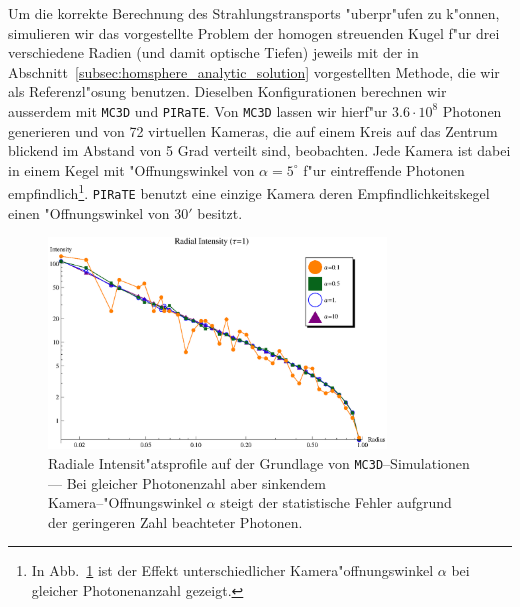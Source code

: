 	Um die korrekte Berechnung des Strahlungstransports "uberpr"ufen zu k"onnen, simulieren wir das vorgestellte Problem der homogen streuenden Kugel f"ur drei verschiedene Radien (und damit optische Tiefen) jeweils mit der in Abschnitt~\ref{subsec:homsphere_analytic_solution} vorgestellten Methode, die wir als Referenzl"osung benutzen. Dieselben Konfigurationen berechnen wir ausserdem mit \texttt{MC3D} und \texttt{PIRaTE}. Von \texttt{MC3D} lassen wir hierf"ur $3.6\cdot10^8$ Photonen generieren und von 72 virtuellen Kameras, die auf einem Kreis auf das Zentrum blickend im Abstand von 5 Grad verteilt sind, beobachten. Jede Kamera ist dabei in einem Kegel mit "Offnungswinkel von $\alpha=5^\circ$ f"ur eintreffende Photonen empfindlich\footnote{In Abb.~\ref{fig:alphacomparison} ist der Effekt unterschiedlicher Kamera"offnungswinkel $\alpha$ bei gleicher Photonenanzahl gezeigt.}. \texttt{PIRaTE} benutzt eine einzige Kamera deren Empfindlichkeitskegel einen "Offnungswinkel von $30'$ besitzt.
	
		\begin{figure}
			\centering
			\includegraphics[width=0.8\textwidth]{mc3dalphasplot.eps}
			\caption{Radiale Intensit"atsprofile auf der Grundlage von \texttt{MC3D}--Simulationen --- Bei gleicher Photonenzahl aber sinkendem Kamera--"Offnungswinkel $\alpha$ steigt der statistische Fehler aufgrund der geringeren Zahl beachteter Photonen.}
			\label{fig:alphacomparison}
		\end{figure}
	

